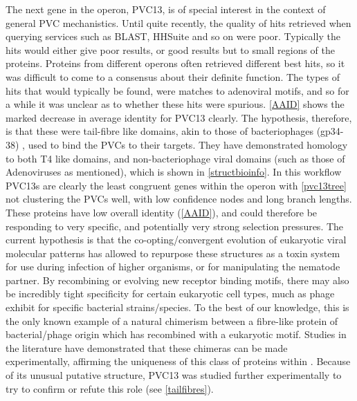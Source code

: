 The next gene in the operon, PVC13, is of special interest in the context of general PVC mechanistics. Until quite recently, the quality of hits retrieved when querying services such as BLAST, HHSuite and so on were poor. Typically the hits would either give poor results, or good results but to small regions of the proteins. Proteins from different operons often retrieved different best hits, so it was difficult to come to a consensus about their definite function. The types of hits that would typically be found, were matches to adenoviral motifs, and so for a while it was unclear as to whether these hits were spurious. \vref{AAID} shows the marked decrease in average identity for PVC13 clearly. The hypothesis, therefore, is that these were tail-fibre like domains, akin to those of bacteriophages (gp34-38) \citep{Bartual2010, Leiman2010}, used to bind the PVCs to their targets. They have demonstrated homology to both T4 like domains, and non-bacteriophage viral domains (such as those of Adenoviruses as mentioned), which is shown in \vref{structbioinfo}. In this workflow PVC13s are clearly the least congruent genes within the operon with \vref{pvc13tree} not clustering the PVCs well, with low confidence nodes and long branch lengths. These proteins have low overall identity (\vref{AAID}), and could therefore be responding to very specific, and potentially very strong selection pressures. The current hypothesis is that the co-opting/convergent evolution of eukaryotic viral molecular patterns has allowed \Pa{} to repurpose these structures as a toxin system for use during infection of higher organisms, or for manipulating the nematode partner. By recombining or evolving new receptor binding motifs, there may also be incredibly tight specificity for certain eukaryotic cell types, much as phage exhibit for specific bacterial strains/species. To the best of our knowledge, this is the only known example of a natural chimerism between a fibre-like protein of bacterial/phage origin which has recombined with a eukaryotic motif. Studies in the literature have demonstrated that these chimeras can be made experimentally, affirming the uniqueness of this class of proteins within \Pa{} \citep{Papanikolopoulou2004}. Because of its unusual putative structure, PVC13 was studied further experimentally to try to confirm or refute this role (see \vref{tailfibres}).

